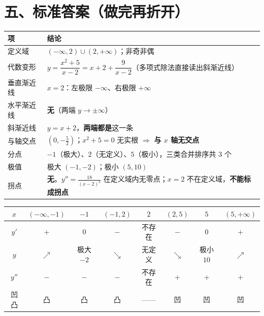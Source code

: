 \documentclass[11pt,a4paper]{ctexart}
\begin{document}
\vspace{6pt}

\newpage
\section{五、标准答案（做完再折开）}


\begin{center}\footnotesize
\begin{tabular}{@{}p{2.4cm}p{12.2cm}@{}}
\toprule
\textbf{项} & \textbf{结论} \\
\midrule
定义域 & $(-\infty,2)\cup(2,+\infty)$；非奇非偶 \\
代数变形 & $y=\dfrac{x^{2}+5}{x-2}=x+2+\dfrac{9}{x-2}$（多项式除法直接读出斜渐近线） \\
垂直渐近线 & $x=2$：左极限 $-\infty$、右极限 $+\infty$ \\
水平渐近线 & \textbf{无}（两端 $y\to\pm\infty$） \\
斜渐近线 & $y=x+2$，\textbf{两端都是}这一条 \\
与轴交点 & $(0,-\frac52)$；$x^{2}+5=0$ 无实根 $\Rightarrow$ \textbf{与 $x$ 轴无交点} \\
分点 & $-1$（极大）、$2$（无定义）、$5$（极小），三类合并排序共 3 个 \\
极值 & 极大 $(-1,-2)$；极小 $(5,10)$ \\
拐点 & \textbf{无}。$y''=\frac{18}{(x-2)^{3}}$ 在定义域内无零点；$x=2$ 不在定义域，\textbf{不能标成拐点} \\
\bottomrule
\end{tabular}
\end{center}

\vspace{6pt}

\begin{center}
\footnotesize\setlength{\tabcolsep}{3pt}
\begin{tabular}{@{}c|ccccccc@{}}
$x$ & $(-\infty,-1)$ & $-1$ & $(-1,2)$ & $2$ & $(2,5)$ & $5$ & $(5,+\infty)$ \\
\hline
$y'$ & $+$ & $0$ & $-$ & 不存在 & $-$ & $0$ & $+$ \\
$y$ & $\nearrow$ & 极大 $-2$ & $\searrow$ & 无定义 & $\searrow$ & 极小 $10$ & $\nearrow$ \\
$y''$ & $-$ & $-$ & $-$ & 不存在 & $+$ & $+$ & $+$ \\
凹凸 & 凸 & 凸 & 凸 & —— & 凹 & 凹 & 凹 \\
\bottomrule
\end{tabular}
\end{center}
\end{document}
